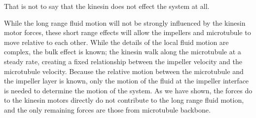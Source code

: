 \documentclass[11pt]{ucthesis}
\begin{document}
That is not to say that the kinesin does not effect the system at all.

While the long range fluid motion will not be strongly influenced by the kinesin motor forces, these short range effects will allow the impellers and microtubule to move relative to each other. While the details of the local fluid motion are complex, the bulk effect is known; the kinesin walk along the microtubule at a steady rate, creating a fixed relationship between the impeller velocity and the microtubule velocity. 
Because the relative motion between the microtubule and the impeller layer is known, only the motion of the fluid at the impeller interface is needed to determine the motion of the system. 
As we have shown, the forces do to the kinesin motors directly do not contribute to the long range fluid motion, and the only remaining forces are those from microtubule backbone.
\end{document}
